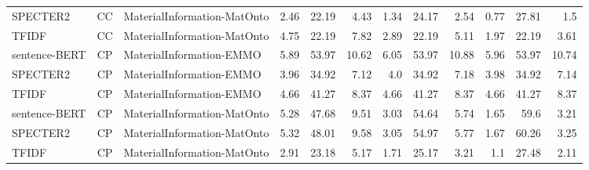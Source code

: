 \begin{table}[h]
\begin{tabular}{|l|c|l|r|r|r|r|r|r|r|r|r|}
	SPECTER2  & CC & MaterialInformation-MatOnto  & 2.46 & 22.19 & 4.43 & 1.34 & 24.17 & 2.54 & 0.77 & 27.81 & 1.5\\
	TFIDF  & CC & MaterialInformation-MatOnto  & 4.75 & 22.19 & 7.82 & 2.89 & 22.19 & 5.11 & 1.97 & 22.19 & 3.61\\
	\hline
	sentence-BERT  & CP & MaterialInformation-EMMO  & 5.89 & 53.97 & 10.62 & 6.05 & 53.97 & 10.88 & 5.96 & 53.97 & 10.74\\
	SPECTER2  & CP & MaterialInformation-EMMO  & 3.96 & 34.92 & 7.12 & 4.0 & 34.92 & 7.18 & 3.98 & 34.92 & 7.14\\
	TFIDF  & CP & MaterialInformation-EMMO  & 4.66 & 41.27 & 8.37 & 4.66 & 41.27 & 8.37 & 4.66 & 41.27 & 8.37\\
	\hline
	sentence-BERT  & CP & MaterialInformation-MatOnto  & 5.28 & 47.68 & 9.51 & 3.03 & 54.64 & 5.74 & 1.65 & 59.6 & 3.21\\
	SPECTER2  & CP & MaterialInformation-MatOnto  & 5.32 & 48.01 & 9.58 & 3.05 & 54.97 & 5.77 & 1.67 & 60.26 & 3.25\\
	TFIDF  & CP & MaterialInformation-MatOnto  & 2.91 & 23.18 & 5.17 & 1.71 & 25.17 & 3.21 & 1.1 & 27.48 & 2.11\\
	\hline
    \end{tabular}
\end{table}
